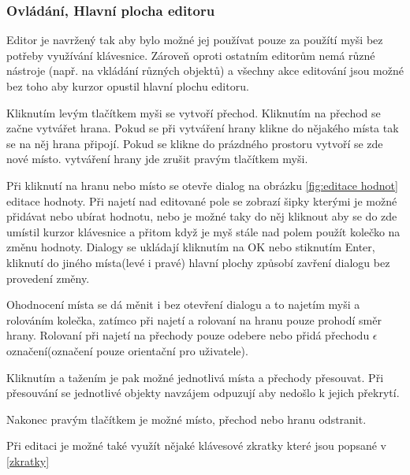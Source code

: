 \documentclass[
  biblatex,
  glossaries,
  index
]{kidiplom}
\begin{document}
\subsubsection{Ovládání, Hlavní plocha editoru}\label{hlavní plocha}

Editor je navržený tak aby bylo možné jej používat pouze za použítí 
myši bez potřeby využívání klávesnice. Zároveň oproti ostatním editorům
nemá různé nástroje (např. na vkládání různých objektů) a všechny 
akce editování jsou možné bez toho aby kurzor opustil hlavní plochu editoru.

Kliknutím levým tlačítkem myši se vytvoří přechod. 
Kliknutím na přechod se začne vytvářet hrana. Pokud se při 
vytváření hrany klikne do nějakého místa tak se na něj hrana 
připojí. Pokud se klikne do prázdného prostoru vytvoří se zde nové místo.
vytváření hrany jde zrušit pravým tlačítkem myši.

Při kliknutí na hranu nebo místo se otevře dialog na obrázku \ref{fig:editace hodnot} editace hodnoty.
Při najetí nad editované pole se zobrazí šipky kterými 
je možné přidávat nebo ubírat hodnotu, nebo je možné taky 
do něj kliknout aby se do zde umístil kurzor klávesnice a 
přitom když je myš stále nad polem použít kolečko na změnu hodnoty.
Dialogy se ukládají kliknutím na OK nebo stiknutím Enter, kliknutí do jiného místa(levé i pravé) 
hlavní plochy způsobí zavření dialogu bez provedení změny.

Ohodnocení místa se dá měnit i bez otevření dialogu a to najetím myši
a rolováním kolečka, zatímco při najetí a rolovaní na hranu pouze prohodí směr
hrany. Rolovaní při najetí na přechody pouze odebere nebo přidá přechodu 
$\epsilon$ označení(označení pouze orientační pro uživatele).

Kliknutím a tažením je pak možné jednotlivá místa a přechody přesouvat.
Při přesouvání se jednotlivé objekty navzájem odpuzují aby nedošlo k jejich překrytí.

Nakonec pravým tlačítkem je možné místo, přechod nebo hranu odstranit.

Při editaci je možné také využít nějaké klávesové zkratky které jsou popsané v \ref{zkratky}
\end{document}

